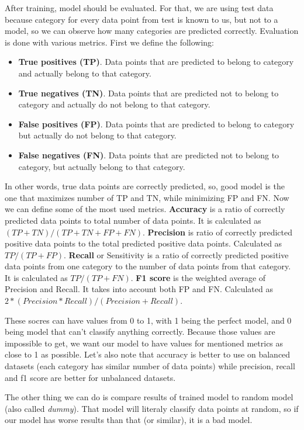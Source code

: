 \documentclass[a4paper]{article}
\begin{document}
After training, model should be evaluated. For that, we are using test data because category for every data point from test is known to us, but not to a model, so we can observe how many categories are predicted correctly. Evaluation is done with various metrics. First we define the following:

\begin{itemize}
	\item \textbf{True positives (TP)}. Data points that are predicted to belong to category and actually belong to that category.
	\item \textbf{True negatives (TN)}. Data points that are predicted not to belong to category and actually do not belong to that category.
	\item \textbf{False positives (FP)}. Data points that are predicted to belong to category but actually do not belong to that category. 
	\item \textbf{False negatives (FN)}. Data points that are predicted not to belong to category, but actually belong to that category.
\end{itemize}

In other words, true data points are correctly predicted, so, good model is the one that maximizes number of TP and TN, while minimizing FP and FN. Now we can define some of the most used metrics. \textbf{Accuracy} is a ratio of correctly predicted data points to total number of data points. It is calculated as $(TP + TN) / (TP + TN + FP + FN)$. \textbf{Precision} is ratio of correctly predicted positive data points to the total predicted positive data points. Calculated as $TP / (TP + FP)$. \textbf{Recall} or Sensitivity is a ratio of correctly predicted positive data points from one category to the number of data points from that category. It is calculated as $TP / (TP + FN)$. \textbf{F1 score} is the weighted average of Precision and Recall. It takes into account both FP and FN. Calculated as $2 * (Precision * Recall) / (Precision + Recall)$.

These socres can have values from 0 to 1, with 1 being the perfect model, and 0 being model that can't classify anything correctly. Because those values are impossible to get, we want our model to have values for mentioned metrics as close to 1 as possible. Let's also note that accuracy is better to use on balanced datasets (each category has similar number of data points) while precision, recall and f1 score are better for unbalanced datasets.

The other thing we can do is compare results of trained model to random model (also called \textit{dummy}). That model will literaly classify data points at random, so if our model has worse results than that (or similar), it is a bad model. 
\end{document}
